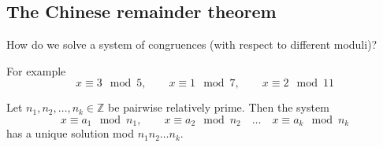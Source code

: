 \documentclass[english]{lbscript}
\begin{document}
\subsection{The Chinese remainder theorem}
\label{sec:chin-rema-theor}

How do we solve a system of congruences (with respect to different moduli)?

For example
\begin{equation}
  \label{eq:119}
  x≡3 \mod 5, \quad\quad  x≡1 \mod 7, \quad\quad x≡2 \mod 11
\end{equation}

\begin{theorem}{}{}
  Let \(n_1,n_2, \dots, n_k∈ℤ\) be pairwise relatively prime. Then the system
  \begin{equation}
    \label{eq:120}
    x≡a_1\mod n_1, \quad \quad x≡a_2 \mod n_2\quad  \dots\quad x≡a_k \mod n_k
  \end{equation}
  has a unique solution mod \(n_1n_2\dots n_k\).
\end{theorem}
\end{document}
